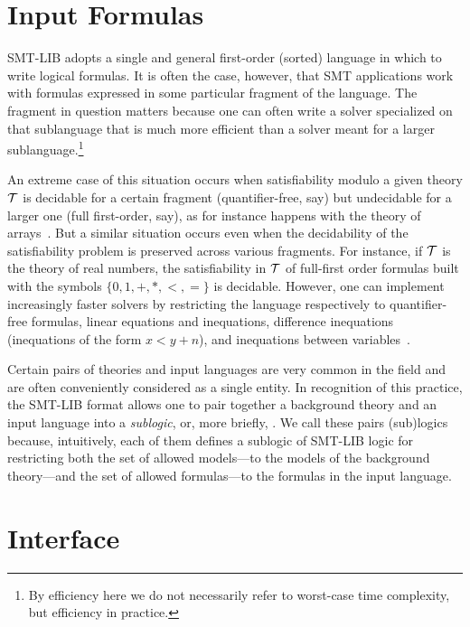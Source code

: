 \section{Input Formulas}

SMT-LIB adopts a single and general first-order (sorted) language 
in which to write logical formulas.
It is often the case, however, that 
SMT applications work with formulas expressed in some particular fragment 
of the language.
The fragment in question matters
because one can often write a solver specialized on that sublanguage 
that is much more efficient than a solver meant for a larger sublanguage.\footnote{
By efficiency here we do not necessarily refer to worst-case time complexity,
but efficiency in practice.
}

An extreme case of this situation occurs
when satisfiability modulo a given theory $\mathcal{T}$
is decidable for a certain fragment (quantifier-free, say)
but undecidable for a larger one (full first-order, say),
as for instance happens with the theory of arrays~\cite{BraMS-VMCAI-06}.
But a similar situation occurs even
when the decidability of the satisfiability problem is preserved 
across various fragments.
For instance, 
if $\mathcal{T}$ is the theory of real numbers,
the satisfiability in $\mathcal{T}$ of full-first order formulas
built with the symbols $\{0,1,+,*,<,=\}$ is decidable.
However, one can implement increasingly faster solvers by restricting
the language respectively to quantifier-free formulas, 
linear equations and inequations,
difference inequations (inequations of the form $x < y + n$),
and
inequations between variables~\cite{Bozzanoetal2005TACAS}.

Certain pairs of theories and input languages are very common in the field
and are often conveniently considered as a single entity.
In recognition of this practice,
the SMT-LIB format allows one to pair together 
a background theory and an input language into a \emph{sublogic}, 
or, more briefly, .
We call these pairs (sub)logics because,
intuitively, 
each of them defines a sublogic of SMT-LIB logic
for restricting 
both the set of allowed models---to the models of the background theory---and 
the set of allowed formulas---to the formulas in the input language.


\section{Interface}

